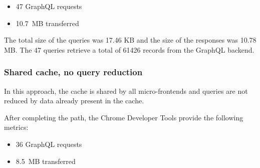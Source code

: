 \documentclass[MSE,Master,english]{twbook}%
\begin{document}
\begin{itemize}
    \item 47 GraphQL requests
    \item 10.7 MB transferred
\end{itemize}

\ifshowUnusedContent



\fi

The total size of the queries was 17.46 KB and the size of the responses was 10.78 MB. The 47 queries retrieve a total of 61426 records from the GraphQL backend.

\subsubsection{Shared cache, no query reduction}

In this approach, the cache is shared by all micro-frontends and queries are not reduced by data already present in the cache.

After completing the path, the Chrome Developer Tools provide the following metrics:

\begin{itemize}
    \item 36 GraphQL requests
    \item 8.5 MB transferred
\end{itemize}
\end{document}
